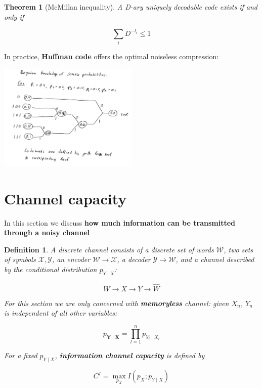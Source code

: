 \documentclass{article}
\newtheorem{definition}{Definition}[section]
\newtheorem{theorem}{Theorem}[section]
\begin{document}
    \begin{theorem}[McMillan inequality]
        A D-ary uniquely decodable code exists if and only if
        
        \begin{equation*}
            \sum_{i}D^{-l_i} \leq 1
        \end{equation*}
    \end{theorem}

    In practice, \textbf{Huffman code} offers the optimal noiseless compression:

    \includegraphics[width=0.5\textwidth]{./img/huffman-example.png}

\section{Channel capacity}
    In this section we discuss \textbf{how much information can be transmitted through a noisy channel}

    \begin{definition}
        A discrete channel consists of a discrete set of words $\mathcal{W}$, two sets of symbols $\mathcal{X}, \mathcal{Y}$, an encoder $\mathcal{W} \rightarrow \mathcal{X}$, a decoder $\mathcal{Y} \rightarrow \mathcal{W}$, and a channel described by the conditional distribution $p_{Y \mid X}$:

        \begin{equation*}
            W \rightarrow X \rightarrow Y \rightarrow \hat{W}
        \end{equation*}

        For this section we are only concerned with \textbf{memoryless} channel: given $X_n$, $Y_n$ is independent of all other variables:

        \begin{equation*}
            p_{\mathbf{Y} \mid \mathbf{X}} = \prod_{l=1}^n p_{Y_l \mid X_l}
        \end{equation*}

        For a fixed $p_{Y \mid X}$, \textbf{information channel capacity} is defined by

        \begin{equation*}
            C^I = \max_{p_X} I(p_X; p_{Y \mid X})
        \end{equation*}
    \end{definition}
\end{document}
